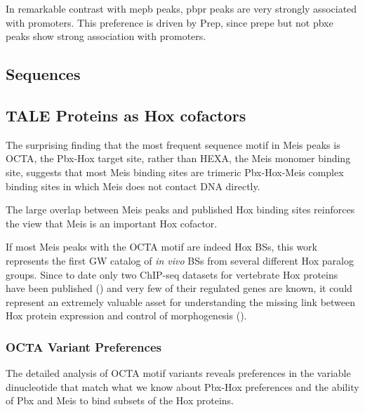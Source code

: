 
In remarkable contrast with \ac{mepb} peaks, \ac{pbpr} peaks are very strongly associated with promoters. This preference is driven by Prep, since \ac{prepe} but not \ac{pbxe} peaks show strong association with promoters.  

\subsection{Sequences}



\subsection{TALE Proteins as Hox cofactors}

The surprising finding that the most frequent sequence motif in Meis peaks is \ac{OCTA}, the Pbx-Hox target site, rather than \ac{HEXA}, the Meis monomer binding site, suggests that most Meis binding sites are trimeric Pbx-Hox-Meis complex binding sites in which Meis does not contact DNA directly. 


The large overlap between Meis peaks and published Hox binding sites reinforces the view that Meis is an important Hox cofactor. 

If most Meis peaks with the \ac{OCTA} motif are indeed Hox \acp{BS}, this work represents the first \ac{GW} catalog of \textit{in vivo} \acp{BS} from several different Hox paralog groups. Since to date only two ChIP-seq datasets for vertebrate Hox proteins have been published (\cite{Jung2010, Donaldson2012}) and very few of their regulated genes are known, it could represent an extremely valuable asset for understanding the missing link between Hox protein expression and control of morphogenesis (\cite{ref}).

\subsubsection{OCTA Variant Preferences}

The detailed analysis of \ac{OCTA} motif variants reveals preferences in the variable dinucleotide that match what we know about Pbx-Hox preferences and the ability of Pbx and Meis to bind subsets of the Hox proteins. 

